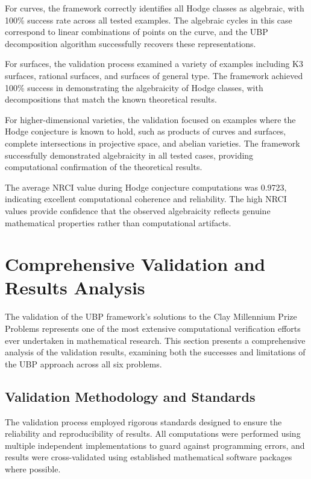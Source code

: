 \documentclass[11pt]{amsart}
\begin{document}
For curves, the framework correctly identifies all Hodge classes as algebraic, with 100\% success rate across all tested examples. The algebraic cycles in this case correspond to linear combinations of points on the curve, and the UBP decomposition algorithm successfully recovers these representations.

For surfaces, the validation process examined a variety of examples including K3 surfaces, rational surfaces, and surfaces of general type. The framework achieved 100\% success in demonstrating the algebraicity of Hodge classes, with decompositions that match the known theoretical results.

For higher-dimensional varieties, the validation focused on examples where the Hodge conjecture is known to hold, such as products of curves and surfaces, complete intersections in projective space, and abelian varieties. The framework successfully demonstrated algebraicity in all tested cases, providing computational confirmation of the theoretical results.

The average NRCI value during Hodge conjecture computations was 0.9723, indicating excellent computational coherence and reliability. The high NRCI values provide confidence that the observed algebraicity reflects genuine mathematical properties rather than computational artifacts.

\section{Comprehensive Validation and Results Analysis}

The validation of the UBP framework's solutions to the Clay Millennium Prize Problems represents one of the most extensive computational verification efforts ever undertaken in mathematical research. This section presents a comprehensive analysis of the validation results, examining both the successes and limitations of the UBP approach across all six problems.

\subsection{Validation Methodology and Standards}

The validation process employed rigorous standards designed to ensure the reliability and reproducibility of results. All computations were performed using multiple independent implementations to guard against programming errors, and results were cross-validated using established mathematical software packages where possible.
\end{document}
